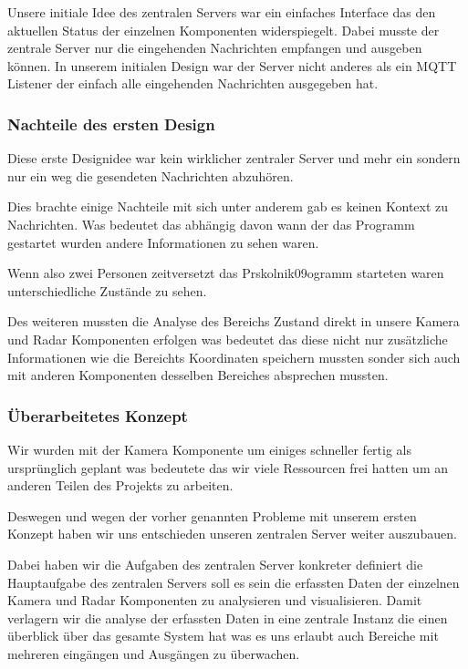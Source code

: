 \documentclass[report]{scrartcl}
\begin{document}
Unsere initiale Idee des zentralen Servers war ein einfaches Interface das den
aktuellen Status der einzelnen Komponenten widerspiegelt. Dabei musste der
zentrale Server nur die eingehenden Nachrichten empfangen und ausgeben können.
In unserem initialen Design war der Server nicht anderes als ein MQTT Listener
der einfach alle eingehenden Nachrichten ausgegeben hat.

\subsubsection{Nachteile des ersten Design}

Diese erste Designidee war kein wirklicher zentraler Server und mehr ein
sondern nur ein weg die gesendeten Nachrichten abzuhören.

Dies brachte einige Nachteile mit sich unter anderem gab es keinen Kontext zu
Nachrichten. Was bedeutet das abhängig davon wann der das Programm gestartet
wurden andere Informationen zu sehen waren.

Wenn also zwei Personen zeitversetzt das Prskolnik09ogramm starteten waren
unterschiedliche Zustände zu sehen.

Des weiteren mussten die Analyse des Bereichs Zustand direkt in unsere Kamera
und Radar Komponenten erfolgen was bedeutet das diese nicht nur zusätzliche
Informationen wie die Bereichts Koordinaten speichern mussten sonder sich auch
mit anderen Komponenten desselben Bereiches absprechen mussten.

\subsubsection{Überarbeitetes Konzept}

Wir wurden mit der Kamera Komponente um einiges schneller fertig als
ursprünglich geplant was bedeutete das wir viele Ressourcen frei hatten um an
anderen Teilen des Projekts zu arbeiten.

Deswegen und wegen der vorher genannten Probleme mit unserem ersten Konzept
haben wir uns entschieden unseren zentralen Server weiter auszubauen.

Dabei haben wir die Aufgaben des zentralen Server konkreter definiert die
Hauptaufgabe des zentralen Servers soll es sein die erfassten Daten der
einzelnen Kamera und Radar Komponenten zu analysieren und visualisieren. Damit
verlagern wir die analyse der erfassten Daten in eine zentrale Instanz die
einen überblick über das gesamte System hat was es uns erlaubt auch Bereiche
mit mehreren eingängen und Ausgängen zu überwachen.
\end{document}
